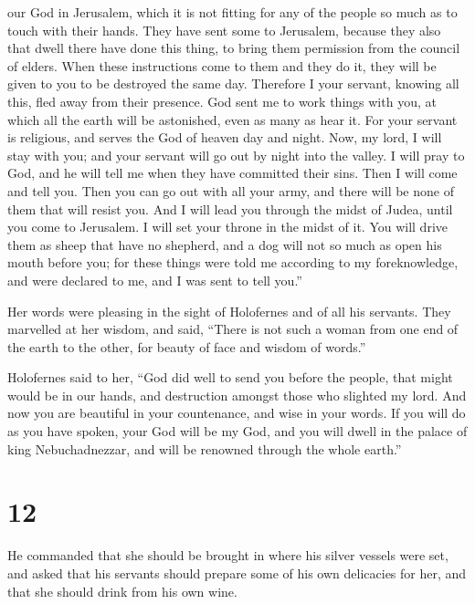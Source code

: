 our God in Jerusalem, which it is not fitting for any of the people so
much as to touch with their hands.  They have sent some to
Jerusalem, because they also that dwell there have done this thing, to
bring them permission from the council of elders.  When
these instructions come to them and they do it, they will be given to
you to be destroyed the same day.  Therefore I your
servant, knowing all this, fled away from their presence. God sent me to
work things with you, at which all the earth will be astonished, even as
many as hear it.  For your servant is religious, and serves
the God of heaven day and night. Now, my lord, I will stay with you; and
your servant will go out by night into the valley. I will pray to God,
and he will tell me when they have committed their sins. 
Then I will come and tell you. Then you can go out with all your army,
and there will be none of them that will resist you.  And I
will lead you through the midst of Judea, until you come to Jerusalem. I
will set your throne in the midst of it. You will drive them as sheep
that have no shepherd, and a dog will not so much as open his mouth
before you; for these things were told me according to my foreknowledge,
and were declared to me, and I was sent to tell you.''

 Her words were pleasing in the sight of Holofernes and of
all his servants. They marvelled at her wisdom, and said, 
``There is not such a woman from one end of the earth to the other, for
beauty of face and wisdom of words.''

 Holofernes said to her, ``God did well to send you before
the people, that might would be in our hands, and destruction amongst
those who slighted my lord.  And now you are beautiful in
your countenance, and wise in your words. If you will do as you have
spoken, your God will be my God, and you will dwell in the palace of
king Nebuchadnezzar, and will be renowned through the whole earth.''

\hypertarget{section-11}{%
\section{12}\label{section-11}}

 He commanded that she should be brought in where his silver
vessels were set, and asked that his servants should prepare some of his
own delicacies for her, and that she should drink from his own wine.

